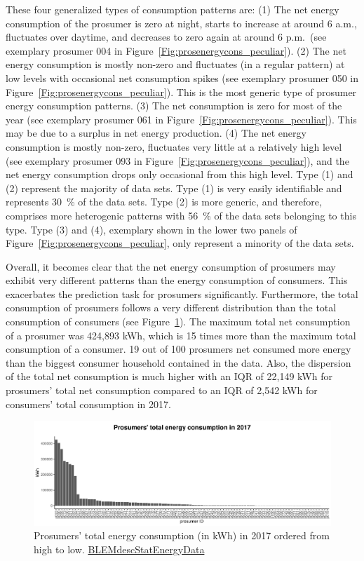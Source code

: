 \noindent These four generalized types of consumption patterns are: (1) The net energy consumption of the prosumer is zero at night, starts to increase at around 6 a.m., fluctuates over daytime, and decreases to zero again at around 6 p.m.~(see exemplary prosumer 004 in Figure~\ref{Fig:prosenergycons_peculiar}). (2) The net energy consumption is mostly non-zero and fluctuates (in a regular pattern) at low levels with occasional net consumption spikes (see exemplary prosumer 050 in Figure~\ref{Fig:prosenergycons_peculiar}). This is the most generic type of prosumer energy consumption patterns. (3) The net consumption is zero for most of the year (see exemplary prosumer 061 in Figure~\ref{Fig:prosenergycons_peculiar}). This may be due to a surplus in net energy production. (4) The net energy consumption is mostly non-zero, fluctuates very little at a relatively high level (see exemplary prosumer 093 in Figure~\ref{Fig:prosenergycons_peculiar}), and the net energy consumption drops only occasional from this high level. Type (1) and (2) represent the majority of data sets. Type (1) is very easily identifiable and represents 30~\% of the data sets. Type (2) is more generic, and therefore, comprises more heterogenic patterns with 56~\% of the data sets belonging to this type. Type (3) and (4), exemplary shown in the lower two panels of Figure~\ref{Fig:prosenergycons_peculiar}, only represent a minority of the data sets.

Overall, it becomes clear that the net energy consumption of prosumers may exhibit very different patterns than the energy consumption of consumers. This exacerbates the prediction task for prosumers significantly. Furthermore, the total consumption of prosumers follows a very different distribution than the total consumption of consumers (see Figure~\ref{Fig:pros_total_consumption}). The maximum total net consumption of a prosumer was 424,893 kWh, which is 15 times more than the maximum total consumption of a consumer. 19 out of 100 prosumers net consumed more energy than the biggest consumer household contained in the data. Also, the dispersion of the total net consumption is much higher with an IQR of 22,149 kWh for prosumers' total net consumption compared to an IQR of 2,542 kWh for consumers' total consumption in 2017.

\begin{figure}[H]
 \centering
\includegraphics[width=\textwidth]{thesis/graphs/prosumer_totalconsumption.pdf}
\caption[Prosumers’ total energy consumption in 2017]{Prosumers’ total energy consumption (in kWh) in 2017 ordered from high to low. \quantnet\href{https://github.com/QuantLet/BLEM/tree/master/BLEMdescStatEnergyData}{BLEMdescStatEnergyData}}
\label{Fig:pros_total_consumption}
\end{figure}


